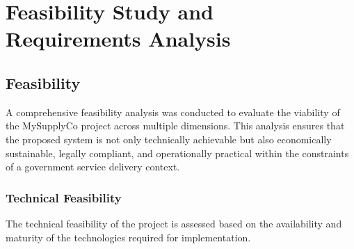 \chapter{Feasibility Study and Requirements Analysis}

\section{Feasibility}

A comprehensive feasibility analysis was conducted to evaluate the viability of the MySupplyCo project across multiple dimensions. This analysis ensures that the proposed system is not only technically achievable but also economically sustainable, legally compliant, and operationally practical within the constraints of a government service delivery context.

\subsection{Technical Feasibility}

The technical feasibility of the project is assessed based on the availability and maturity of the technologies required for implementation.

